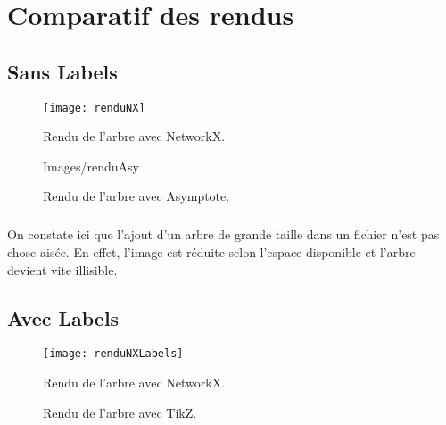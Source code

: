 \chapter{Comparatif des rendus}

	\section{Sans Labels}
	
\begin{figure}[h]
\begin{center}
\texttt{[image: renduNX]}
\caption{Rendu de l'arbre avec NetworkX.}
\end{center}
\end{figure}



\begin{figure}[h] \centering %
 {Images/renduAsy} %
\caption{Rendu de l'arbre avec Asymptote.}
\end{figure}

\paragraph{} On constate ici que l'ajout d'un arbre de grande taille dans un fichier n'est pas chose aisée. En effet, l'image est réduite selon l'espace disponible et l'arbre devient vite illisible.

	\section{Avec Labels}
	
\begin{figure}[h]
\begin{center}
\texttt{[image: renduNXLabels]}
\caption{Rendu de l'arbre avec NetworkX.}
\end{center}
\end{figure}


\begin{figure}[h] \centering \resizebox {!}{10cm} {
}
\caption{Rendu de l'arbre avec TikZ.}
\end{figure}


